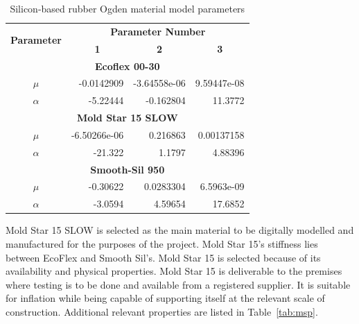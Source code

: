 \begin{table}[H]
\centering
\caption[Ogden material model parameters]{Silicon-based rubber Ogden material model parameters \citep{Ellis2020}}
\label{tab:ogdpar}
\begin{tabular}{@{}crrr@{}}
\toprule
\multirow{2}{*}{\textbf{Parameter}} & \multicolumn{3}{c}{\textbf{Parameter Number}}                                                    \\ \cmidrule(l){2-4} 
                                    & \multicolumn{1}{c}{\textbf{1}} & \multicolumn{1}{c}{\textbf{2}} & \multicolumn{1}{c}{\textbf{3}} \\ \midrule
\multicolumn{4}{c}{\textbf{Ecoflex 00-30}}           \\ \midrule
$\mu$    & -0.0142909   & -3.64558e-06 & 9.59447e-08 \\
$\alpha$ & -5.22444     & -0.162804    & 11.3772     \\ \midrule
\multicolumn{4}{c}{\textbf{Mold Star 15 SLOW}}       \\ \midrule
$\mu$    & -6.50266e-06 & 0.216863     & 0.00137158  \\
$\alpha$ & -21.322      & 1.1797       & 4.88396     \\ \midrule
\multicolumn{4}{c}{\textbf{Smooth-Sil 950}}          \\ \midrule
$\mu$    & -0.30622     & 0.0283304    & 6.5963e-09  \\
$\alpha$ & -3.0594      & 4.59654      & 17.6852     \\ \bottomrule
\end{tabular}
\end{table}

Mold Star 15 SLOW is selected as the main material to be digitally modelled and manufactured for the purposes of the project. Mold Star 15's stiffness lies between EcoFlex and Smooth Sil's.  Mold Star 15 is selected because of its availability and physical properties. Mold Star 15 is deliverable to the premises where testing is to be done and available from a registered supplier. It is suitable for inflation while being capable of supporting itself at the relevant scale of construction. Additional relevant properties are listed in Table~\ref{tab:msp}.

